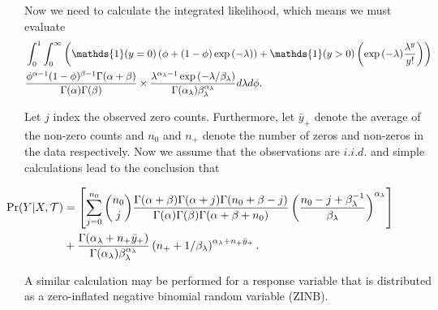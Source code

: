  Now we need to calculate the integrated likelihood, which means we must evaluate 
 \begin{align} \hspace{-.9in}
 &\int_0^1\int_0^\infty \left(\mathds{1}(y=0)\left(\phi + (1-\phi)\exp{(-\lambda)}\right) + \mathds{1}(y>0)\left(\exp{(-\lambda)}\frac{\lambda^y}{y!}\right)\right) \\ \nonumber
 & \frac{\phi^{\alpha-1}(1-\phi)^{\beta-1}\Gamma(\alpha+\beta)}{\Gamma(\alpha)\Gamma(\beta)} \times \frac{ \lambda^{\alpha_{\lambda}-1}\exp{(-\lambda/\beta_{\lambda})} }{\Gamma(\alpha_{\lambda})\beta_{\lambda}^{\alpha_{\lambda}}}d\lambda d\phi.
 \end{align}
 
 Let $j$ index the observed zero counts. Furthermore, let $\bar{y}_{+}$ denote the average of the non-zero counts and $n_0$ and $n_+$ denote the number of zeros and non-zeros in the data respectively. 
 Now we assume that the observations are $i.i.d.$ and simple calculations lead to the conclusion that
 
 \begin{align}\label{eqn:zip_int_lhood}\hspace{-.7in}
 \Pr(Y\vert X, \mathcal{T})& = \left[\sum_{j=0}^{n_0} {n_0 \choose j}\frac{\Gamma(\alpha+\beta)\Gamma(\alpha+j)\Gamma(n_0+\beta-j)}{\Gamma(\alpha)\Gamma(\beta)\Gamma(\alpha+\beta+n_0)}\left(\frac{n_0-j+\beta_{\lambda}^{-1}}{\beta_{\lambda}}\right)^{\alpha_{\lambda}} \right] \\ \nonumber
 & + \frac{\Gamma(\alpha_{\lambda}+n_+\bar{y}_+)}{\Gamma(\alpha_{\lambda})\beta_{\lambda}^{\alpha_{\lambda}}}\left(n_+ + 1/\beta_{\lambda} \right)^{\alpha_{\lambda}+n_+\bar{y}_+}.
\end{align}

A similar calculation may be performed for a response variable that is distributed as a zero-inflated negative binomial random variable (ZINB).
 